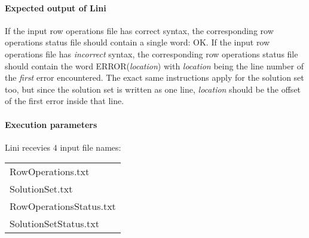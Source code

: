 \documentclass{article}
\begin{document}
\paragraph{Expected output of Lini}
If the input row operations file has correct syntax,
the corresponding row operations status file should contain a single word: OK.
If the input row operations file has \textit{incorrect} syntax,
the corresponding row operations status file should contain the word ERROR(\textit{location}) with \textit{location} being the line number of the \textit{first} error encountered.
The exact same instructions apply for the solution set too,
but since the solution set is written as one line,
\textit{location} should be the offset of the first error inside that line. 


\paragraph{Execution parameters}
Lini recevies $4$ input file names:
\begin{table}[h]
\centering
\begin{tabular}{ l }
  RowOperations.txt       \\
  SolutionSet.txt         \\
  RowOperationsStatus.txt \\
  SolutionSetStatus.txt   \\
\end{tabular}
\end{table}
\end{document}
